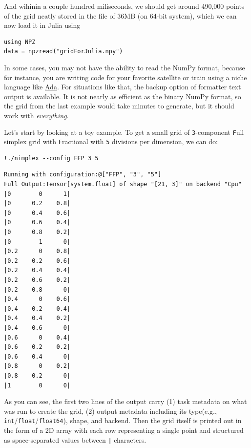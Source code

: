 And wihinin a couple hundred miliseconds, we should get around 490,000
points of the grid neatly stored in the file of 36MB (on 64-bit system),
which we can now load it in Julia using

\begin{verbatim}
using NPZ
data = npzread("gridForJulia.npy")
\end{verbatim}

In some cases, you may not have the ability to read the NumPy format,
because for instance, you are writing code for your favorite satellite
or train using a niche language like \href{https://ada-lang.io}{Ada}.
For situations like that, the backup option of formatter text output is
available. It is not nearly as efficient as the binary NumPy format, so
the grid from the last example would take minutes to generate, but it
should work with \emph{everything}.

Let's start by looking at a toy example. To get a small grid of
\texttt{3}-component \texttt{F}ull
simplex grid with \texttt{F}ractional with
\texttt{5} divisions per dimension, we can do:

\begin{verbatim}
!./nimplex --config FFP 3 5
\end{verbatim}

\begin{verbatim}
Running with configuration:@["FFP", "3", "5"]
Full Output:Tensor[system.float] of shape "[21, 3]" on backend "Cpu"
|0        0      1|
|0      0.2    0.8|
|0      0.4    0.6|
|0      0.6    0.4|
|0      0.8    0.2|
|0        1      0|
|0.2      0    0.8|
|0.2    0.2    0.6|
|0.2    0.4    0.4|
|0.2    0.6    0.2|
|0.2    0.8      0|
|0.4      0    0.6|
|0.4    0.2    0.4|
|0.4    0.4    0.2|
|0.4    0.6      0|
|0.6      0    0.4|
|0.6    0.2    0.2|
|0.6    0.4      0|
|0.8      0    0.2|
|0.8    0.2      0|
|1        0      0|
\end{verbatim}

As you can see, the first two lines of the output carry (1) task
metadata on what was run to create the grid, (2) output metadata
including its type(e.g.,
\texttt{int}/\texttt{float}/\texttt{float64}),
shape, and backend. Then the grid itself is printed out in the form of a
2D array with each row representing a single point and structured as
space-separated values between \texttt{|} characters.

